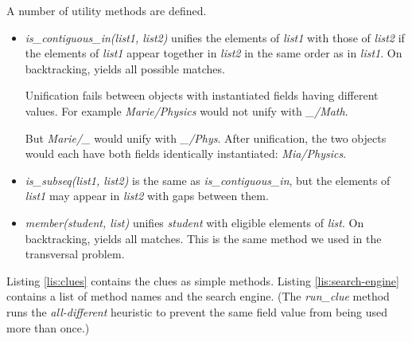 A number of utility methods are defined.
\begin{itemize}
    \item \textit{is\_contiguous\_in(list1, list2)} unifies the elements of \textit{list1} with those of \textit{list2} if the elements of \textit{list1} appear together in \textit{list2} in the same order as in \textit{list1}. On backtracking, yields all possible matches. 
    
    \smallv
    Unification fails between objects with instantiated fields having different values. For example \textit{Marie/Physics} would not unify with \textit{\_/Math}.
    
    \smallv
    But \textit{Marie/\_} would unify with \textit{\_/Phys}. After unification, the two objects would each have both fields identically instantiated: \textit{Mia/Physics}.
    
    \item \textit{is\_subseq(list1, list2)} is the same as \textit{is\_contiguous\_in}, but the elements of \textit{list1} may appear in \textit{list2} with gaps between them.
    \item \textit{member(student, list)} unifies \textit{student} with eligible elements of \textit{list}. On backtracking, yields all matches. This is the same method we used in the transversal problem.
\end{itemize}

Listing \ref{lis:clues} contains the clues as simple methods. Listing \ref{lis:search-engine} contains a list of method names and the search engine.  (The \textit{run\_clue} method runs the \textit{all-different} heuristic to prevent the same field value from being used more than once.) 


